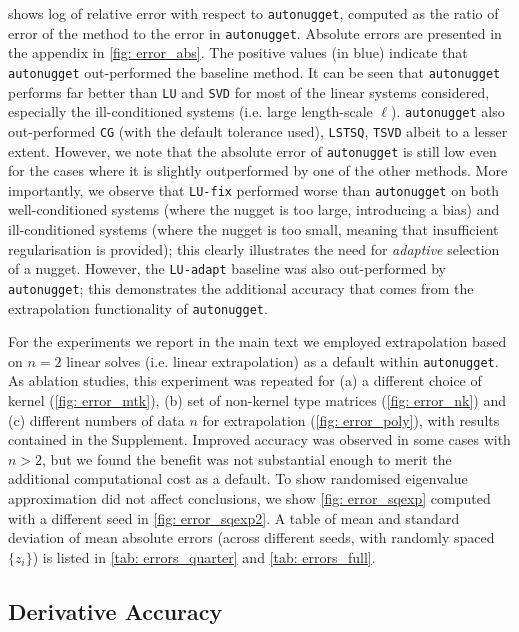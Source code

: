 \documentclass[10pt]{article} %
\begin{document}
 shows log of relative error with respect to \texttt{autonugget}, computed as the ratio of error of the method to the error in \texttt{autonugget}. Absolute errors are presented in the appendix in \cref{fig: error_abs}.
The positive values (in blue) indicate that \texttt{autonugget} out-performed the baseline method. 
It can be seen that \texttt{autonugget} performs far better than \texttt{LU} and \texttt{SVD} for most of the linear systems considered, especially the ill-conditioned systems (i.e. large length-scale $\ell$). 
\texttt{autonugget} also out-performed \texttt{CG} (with the default tolerance used), \texttt{LSTSQ}, \texttt{TSVD} albeit to a lesser extent. However, we note that the absolute error of \texttt{autonugget} is still low even for the cases where it is slightly outperformed by one of the other methods.
More importantly, we observe that \texttt{LU-fix} performed worse than \texttt{autonugget} on both well-conditioned systems (where the nugget is too large, introducing a bias) and ill-conditioned systems (where the nugget is too small, meaning that insufficient regularisation is provided); this clearly illustrates the need for \emph{adaptive} selection of a nugget.
However, the \texttt{LU-adapt} baseline was also out-performed by \texttt{autonugget}; this demonstrates the additional accuracy that comes from the extrapolation functionality of \texttt{autonugget}. 

For the experiments we report in the main text we employed extrapolation based on $n = 2$ linear solves (i.e. linear extrapolation) as a default within \texttt{autonugget}. 
As ablation studies, this experiment was repeated for (a) a different choice of kernel (\cref{fig: error_mtk}), (b) set of non-kernel type matrices (\cref{fig: error_nk}) and (c) different numbers of data $n$ for extrapolation (\cref{fig: error_poly}), with results contained in the Supplement.
Improved accuracy was observed in some cases with $n > 2$, but we found the benefit was not substantial enough to merit the additional computational cost as a default. To show randomised eigenvalue approximation did not affect conclusions, we show \cref{fig: error_sqexp} computed with a different seed in \cref{fig: error_sqexp2}. A table of mean and standard deviation of mean absolute errors (across different seeds, with randomly spaced $\{z_i\}$) is listed in \cref{tab: errors_quarter} and \cref{tab: errors_full}.


\subsection{Derivative Accuracy}
\label{sec: der acc}
\end{document}
